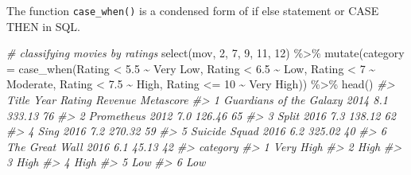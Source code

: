 \documentclass[
]{book}
\newenvironment{Shaded}{\begin{snugshade}}{\end{snugshade}}
\newcommand{\AttributeTok}[1]{\textcolor[rgb]{0.77,0.63,0.00}{#1}}
\newcommand{\CommentTok}[1]{\textcolor[rgb]{0.56,0.35,0.01}{\textit{#1}}}
\newcommand{\DecValTok}[1]{\textcolor[rgb]{0.00,0.00,0.81}{#1}}
\newcommand{\FloatTok}[1]{\textcolor[rgb]{0.00,0.00,0.81}{#1}}
\newcommand{\FunctionTok}[1]{\textcolor[rgb]{0.00,0.00,0.00}{#1}}
\newcommand{\NormalTok}[1]{#1}
\newcommand{\SpecialCharTok}[1]{\textcolor[rgb]{0.00,0.00,0.00}{#1}}
\newcommand{\StringTok}[1]{\textcolor[rgb]{0.31,0.60,0.02}{#1}}
\begin{document}
The function \texttt{case\_when()} is a condensed form of if else statement or CASE THEN in SQL.

\begin{Shaded}
\begin{Highlighting}[]
\CommentTok{\# classifying movies by ratings}
\FunctionTok{select}\NormalTok{(mov, }\DecValTok{2}\NormalTok{, }\DecValTok{7}\NormalTok{, }\DecValTok{9}\NormalTok{, }\DecValTok{11}\NormalTok{, }\DecValTok{12}\NormalTok{) }\SpecialCharTok{\%\textgreater{}\%}
  \FunctionTok{mutate}\NormalTok{(}\AttributeTok{category =} \FunctionTok{case\_when}\NormalTok{(Rating }\SpecialCharTok{\textless{}} \FloatTok{5.5} \SpecialCharTok{\textasciitilde{}} \StringTok{\textquotesingle{}Very Low\textquotesingle{}}\NormalTok{, }
\NormalTok{                              Rating }\SpecialCharTok{\textless{}} \FloatTok{6.5} \SpecialCharTok{\textasciitilde{}} \StringTok{\textquotesingle{}Low\textquotesingle{}}\NormalTok{, }
\NormalTok{                              Rating }\SpecialCharTok{\textless{}} \DecValTok{7} \SpecialCharTok{\textasciitilde{}} \StringTok{\textquotesingle{}Moderate\textquotesingle{}}\NormalTok{, }
\NormalTok{                              Rating }\SpecialCharTok{\textless{}} \FloatTok{7.5} \SpecialCharTok{\textasciitilde{}} \StringTok{\textquotesingle{}High\textquotesingle{}}\NormalTok{, }
\NormalTok{                              Rating }\SpecialCharTok{\textless{}=} \DecValTok{10} \SpecialCharTok{\textasciitilde{}} \StringTok{\textquotesingle{}Very High\textquotesingle{}}\NormalTok{)) }\SpecialCharTok{\%\textgreater{}\%}
  \FunctionTok{head}\NormalTok{()}
\CommentTok{\#\textgreater{}                     Title Year Rating Revenue Metascore}
\CommentTok{\#\textgreater{} 1 Guardians of the Galaxy 2014    8.1  333.13        76}
\CommentTok{\#\textgreater{} 2              Prometheus 2012    7.0  126.46        65}
\CommentTok{\#\textgreater{} 3                   Split 2016    7.3  138.12        62}
\CommentTok{\#\textgreater{} 4                    Sing 2016    7.2  270.32        59}
\CommentTok{\#\textgreater{} 5           Suicide Squad 2016    6.2  325.02        40}
\CommentTok{\#\textgreater{} 6          The Great Wall 2016    6.1   45.13        42}
\CommentTok{\#\textgreater{}    category}
\CommentTok{\#\textgreater{} 1 Very High}
\CommentTok{\#\textgreater{} 2      High}
\CommentTok{\#\textgreater{} 3      High}
\CommentTok{\#\textgreater{} 4      High}
\CommentTok{\#\textgreater{} 5       Low}
\CommentTok{\#\textgreater{} 6       Low}
\end{Highlighting}
\end{Shaded}
\end{document}
